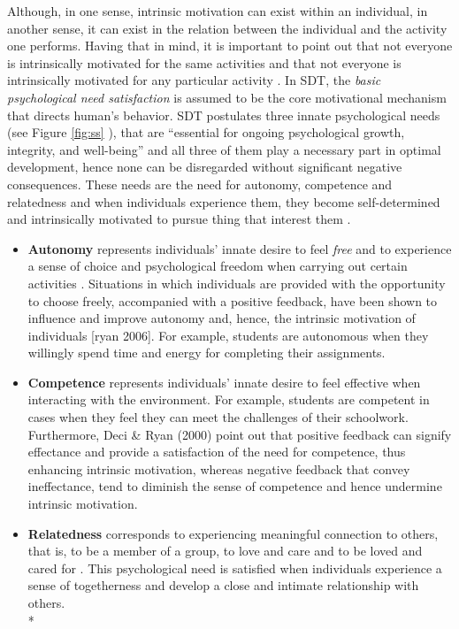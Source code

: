Although, in one sense, intrinsic motivation can exist within an individual, in another sense, it can exist in the relation between the individual and the activity one performs. Having that in mind, it is important to point out that not everyone is intrinsically motivated for the same activities and that not everyone is intrinsically motivated for any particular activity \cite{ryan2000intrinsic}. In SDT, the \textit{basic psychological need satisfaction} is assumed to be the core motivational mechanism that directs human's behavior. SDT postulates three innate psychological needs (see Figure \ref{fig:ss} ), that are ``essential for ongoing psychological growth, integrity, and well-being'' and all three of them play a necessary part in optimal development, hence none can be disregarded without significant negative consequences. These needs are the need for autonomy, competence and relatedness and when individuals experience them, they become self-determined and intrinsically motivated to pursue thing that interest them \cite{deci2000and}. %
\begin{itemize}
\item \textbf{Autonomy} represents individuals' innate desire to feel \textit{free} and to experience a sense of choice and psychological freedom when carrying out certain activities \cite{deci2000and}. Situations in which individuals are provided with the opportunity to choose freely, accompanied with a positive feedback, have been shown to influence and improve autonomy and, hence, the intrinsic motivation of individuals [ryan 2006]. For example, students  are  autonomous when they willingly spend time and energy for completing their assignments. 
\item \textbf{Competence} represents individuals' innate desire to feel effective when interacting with the environment. For example, students are competent in cases when they feel they can meet the challenges of their schoolwork. Furthermore, Deci \& Ryan (2000) point out that positive feedback can signify effectance and provide a satisfaction of the need for competence, thus enhancing intrinsic motivation, whereas negative feedback that convey ineffectance, tend  to
diminish the sense of competence and hence undermine intrinsic motivation. 


\item \textbf{Relatedness} corresponds to experiencing meaningful connection to others, that is, to be a member of a group, to love and care and to be loved and cared for \cite{broeck2010capturing}. This psychological need is satisfied when individuals experience a sense of togetherness and develop a close and intimate relationship with others. \\*
\end{itemize}
